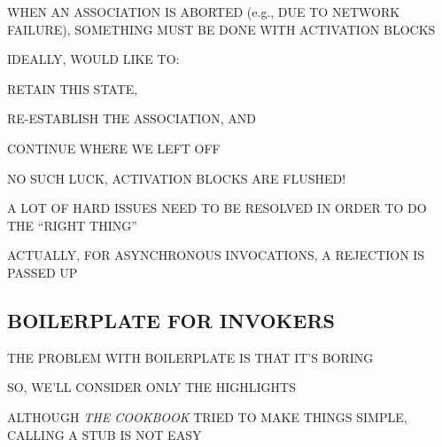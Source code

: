 \begin{bwslide}

\begin{nrtc}
\item	WHEN AN ASSOCIATION IS ABORTED (e.g., DUE TO NETWORK FAILURE),
	SOMETHING MUST BE DONE WITH ACTIVATION BLOCKS

\item	IDEALLY, WOULD LIKE TO:
    \begin{nrtc}
    \item	RETAIN THIS STATE,

    \item	RE-ESTABLISH THE ASSOCIATION, AND

    \item	CONTINUE WHERE WE LEFT OFF
    \end{nrtc}

\item	NO SUCH LUCK, ACTIVATION BLOCKS ARE FLUSHED!
    \begin{nrtc}
    \item	A LOT OF HARD ISSUES NEED TO BE RESOLVED IN ORDER TO DO THE
		``RIGHT THING''

    \item	ACTUALLY, FOR ASYNCHRONOUS INVOCATIONS, A REJECTION IS
		PASSED UP
    \end{nrtc}
\end{nrtc}
\end{bwslide}


\begin{bwslide}
\part*	{BOILERPLATE FOR INVOKERS}\bf

\begin{nrtc}
\item	THE PROBLEM WITH BOILERPLATE IS THAT IT'S BORING

\item	SO, WE'LL CONSIDER ONLY THE HIGHLIGHTS
\end{nrtc}
\end{bwslide}


\begin{bwslide}

\begin{nrtc}
\item	ALTHOUGH \emph{THE COOKBOOK} TRIED TO MAKE THINGS SIMPLE,
	CALLING A STUB IS NOT EASY
\end{nrtc}
\end{bwslide}


